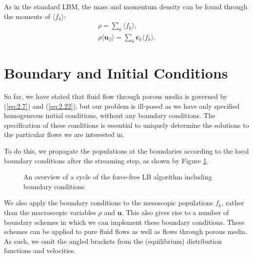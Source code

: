 \documentclass[a4paper, 11pt]{report}
\begin{document}
As in the standard LBM, the mass and momentum density can be found through the moments of $\langle f_k \rangle$:
\begin{subequations} \label{eq:3.44}
\begin{align}
    \rho = \sum_k\langle f_k\rangle, \label{eq:3.44a} \\
    \rho\langle\mathbf{u}_\beta\rangle = \sum_k\mathbf{c}_k\langle f_k\rangle. \label{eq:3.44b}
\end{align}
\end{subequations}


\section{Boundary and Initial Conditions} \label{sec:3.3}
So far, we have stated that fluid flow through porous media is governed by (\ref{eq:2.7}) and (\ref{eq:2.22}), but our problem is ill-posed as we have only specified homogeneous initial conditions, without any boundary conditions. The specification of these conditions is essential to uniquely determine the solutions to the particular flows we are interested in.

To do this, we propagate the populations at the boundaries according to the local boundary conditions after the streaming step, as shown by Figure \ref{fig:bcalgo}.

\begin{figure}[!htb]
\centering

\caption{An overview of a cycle of the force-free LB algorithm including boundary conditions} \label{fig:bcalgo}
\end{figure}

We also apply the boundary conditions to the mesoscopic populations $f_k$, rather than the macroscopic variables $\rho$ and $\mathbf{u}$. This also gives rise to a number of boundary schemes in which we can implement these boundary conditions. These schemes can be applied to pure fluid flows as well as flows through porous media. As such, we omit the angled brackets from the (equilibrium) distribution functions and velocities.
\end{document}
